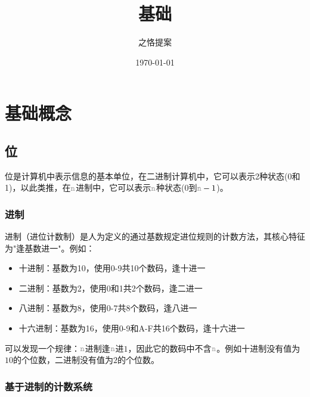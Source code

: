 \documentclass[12pt,a4paper,UTF8]{ctexart}
\title{基础}
\author{之恪提案}
\date{\today}
\newcommand{\var}[1]{\textcolor{lightgray}{\mathtt{#1}}}
\begin{document}
\maketitle
\thispagestyle{empty} %

\setcounter{page}{0} %

\maketitle
\clearpage

\tableofcontents
\newpage

\setcounter{page}{1} %

\section{基础概念}

\subsection{位}

\qquad 位是计算机中表示信息的基本单位，在二进制计算机中，它可以表示2种状态(0和1)，以此类推，在$\var{n}$进制中，它可以表示$\var{n}$种状态(0到$\var{n}-1$)。

\subsubsection{进制}

\qquad 进制（进位计数制）是人为定义的通过基数规定进位规则的计数方法，其核心特征为"逢基数进一"。例如：
\begin{itemize}
\item 十进制：基数为10，使用0-9共10个数码，逢十进一
\item 二进制：基数为2，使用0和1共2个数码，逢二进一
\item 八进制：基数为8，使用0-7共8个数码，逢八进一
\item 十六进制：基数为16，使用0-9和A-F共16个数码，逢十六进一
\end{itemize}

可以发现一个规律：$\var{n}$进制逢$\var{n}$进$1$，因此它的数码中不含$\var{n}$。例如十进制没有值为$10$的个位数，二进制没有值为$2$的个位数。

\subsubsection{基于进制的计数系统}
\end{document}
